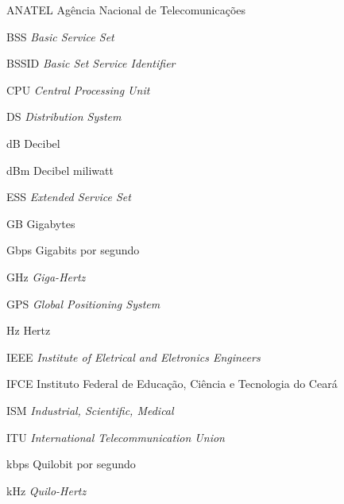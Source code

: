 \begin{siglas} \itemsep -1pt	
	\item[ANATEL] \hspace{.8cm} Agência Nacional de Telecomunicações
	\item[BSS] \hspace{.8cm} \textit{Basic Service Set}
	\item[BSSID] \hspace{.8cm} \textit{Basic Set Service Identifier}
	\item[CPU] \hspace{.8cm} \textit{Central Processing Unit}
	\item[DS] \hspace{.8cm} \textit{Distribution System}
	\item[dB] \hspace{.8cm} Decibel
	\item[dBm] \hspace{.8cm} Decibel miliwatt
	\item[ESS] \hspace{.8cm} \textit{Extended Service Set}
	\item[GB] \hspace{.8cm} Gigabytes
	\item[Gbps] \hspace{.8cm} Gigabits por segundo
	\item[GHz] \hspace{.8cm} \textit{Giga-Hertz}
	\item[GPS] \hspace{.8cm} \textit{Global Positioning System}
	\item[Hz] \hspace{.8cm} Hertz
	\item[IEEE] \hspace{.8cm} \textit{Institute of Eletrical and Eletronics Engineers}
	\item[IFCE] \hspace{.8cm} Instituto Federal de Educação, Ciência e Tecnologia do Ceará
	\item[ISM] \hspace{.8cm} \textit{Industrial, Scientific, Medical}
	\item[ITU] \hspace{.8cm} \textit{International Telecommunication Union}
	\item[kbps] \hspace{.8cm} Quilobit por segundo
	\item[kHz] \hspace{.8cm} \textit{Quilo-Hertz}

\end{siglas}

